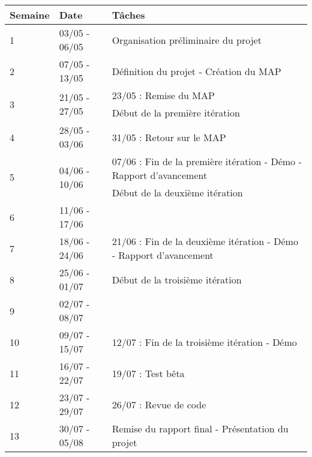 \renewcommand{\arraystretch}{2}
\begin{tabular}{lll}
\hline
\bf Semaine & \bf Date & \bf Tâches \\
\hline
\hline
1 &
03/05 - 06/05 &
Organisation préliminaire du projet \\
%
2 &
07/05 - 13/05 &
Définition du projet - Création du MAP \\
%
\multirow{2}{*}{3} &
\multirow{2}{*}{21/05 - 27/05} &
23/05 : Remise du MAP \\
&& Début de la première itération \\
%
4 &
28/05 - 03/06 &
31/05 : Retour sur le MAP \\
%
\multirow{2}{*}{5} &
\multirow{2}{*}{04/06 - 10/06} &
07/06 : Fin de la première itération - Démo - Rapport d’avancement \\
&& Début de la deuxième itération \\
%
6 &
11/06 - 17/06 & \\
%
7 &
18/06 - 24/06 &
21/06 : Fin de la deuxième itération - Démo - Rapport d’avancement \\
%
8 &
25/06 - 01/07 &
Début de la troisième itération \\
%
9 &
02/07 - 08/07 & \\
%
10 &
09/07 - 15/07 &
12/07 : Fin de la troisième itération - Démo \\
%
11 &
16/07 - 22/07 &
19/07 : Test bêta \\
%
12 &
23/07 - 29/07 &
26/07 : Revue de code \\
%
13 &
30/07 - 05/08 &
Remise du rapport final - Présentation du projet \\
%
\hline
\end{tabular}
